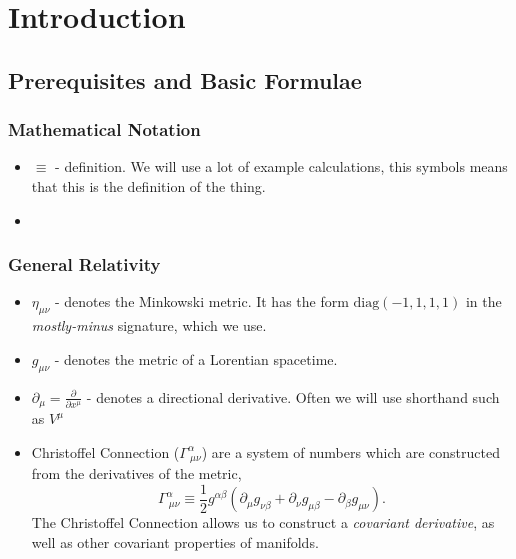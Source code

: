 \chapter{Introduction}
\section{Prerequisites and Basic Formulae}
\subsection{Mathematical Notation}
\begin{itemize}
    \item $\equiv$ - definition. We will use a lot of example calculations, this symbols means that this is the definition of the thing. 
    \item
\end{itemize}

\subsection{General Relativity}
\begin{itemize}
    \item $\eta_{\mu\nu}$ - denotes the Minkowski metric. It has the form $\text{diag}(-1, 1, 1, 1)$ in the \textit{mostly-minus} signature, which we use.
    
    \item $g_{\mu\nu}$ - denotes the metric of a Lorentian spacetime.
    \item $\partial_{\mu} = \frac{\partial}{\partial x^{\mu}}$ - denotes a directional derivative. Often we will use shorthand such as $V^{\mu}$
    \item Christoffel Connection ($\Gamma^{\alpha}_{\ \mu\nu}$) are a system of numbers which are constructed from the derivatives of the metric,
    \begin{equation}
    \Gamma^{\alpha}_{\ \mu\nu}\equiv\frac{1}{2}g^{\alpha\beta}\left(\partial_{\mu}g_{\nu\beta}+\partial_{\nu}g_{\mu\beta} - \partial_{\beta}g_{\mu\nu}\right).
    \end{equation}
    The Christoffel Connection allows us to construct a \textit{covariant derivative}, as well as other covariant properties of manifolds. 
\end{itemize}